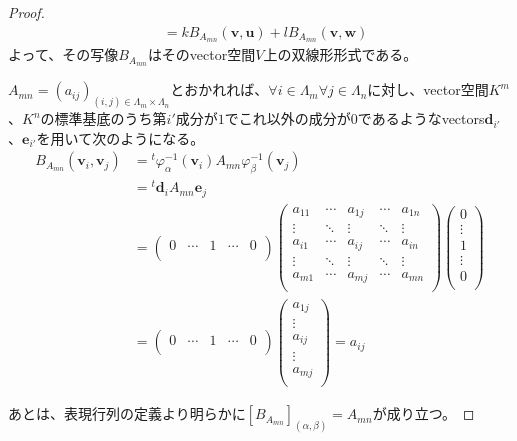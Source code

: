 \documentclass[dvipdfmx]{jsarticle}
\begin{document}
\begin{proof}
\begin{align*}
&= kB_{A_{mn}}\left( \mathbf{v},\mathbf{u} \right) + lB_{A_{mn}}\left( \mathbf{v},\mathbf{w} \right)
\end{align*}
よって、その写像$B_{A_{mn}}$はそのvector空間$V$上の双線形形式である。\par
$A_{mn} = \left( a_{ij} \right)_{(i,j) \in \varLambda_{m} \times \varLambda_{n}}$とおかれれば、$\forall i \in \varLambda_{m}\forall j \in \varLambda_{n}$に対し、vector空間$K^{m}$、$K^{n}$の標準基底のうち第$i'$成分が$1$でこれ以外の成分が$0$であるようなvectors$\mathbf{d}_{i'}$、$\mathbf{e}_{i'}$を用いて次のようになる。
\begin{align*}
B_{A_{mn}}\left( \mathbf{v}_{i},\mathbf{v}_{j} \right) &={}^{t}\varphi_{\alpha}^{- 1}\left( \mathbf{v}_{i} \right)A_{mn}\varphi_{\beta}^{- 1}\left( \mathbf{v}_{j} \right)\\
&={}^{t}\mathbf{d}_{i}A_{mn}\mathbf{e}_{j}\\
&= \begin{pmatrix}
0 & \cdots & 1 & \cdots & 0 \\
\end{pmatrix}\begin{pmatrix}
a_{11} & \cdots & a_{1j} & \cdots & a_{1n} \\
 \vdots & \ddots & \vdots & \ddots & \vdots \\
a_{i1} & \cdots & a_{ij} & \cdots & a_{in} \\
 \vdots & \ddots & \vdots & \ddots & \vdots \\
a_{m1} & \cdots & a_{mj} & \cdots & a_{mn} \\
\end{pmatrix}\begin{pmatrix}
0 \\
 \vdots \\
1 \\
 \vdots \\
0 \\
\end{pmatrix}\\
&= \begin{pmatrix}
0 & \cdots & 1 & \cdots & 0 \\
\end{pmatrix}\begin{pmatrix}
a_{1j} \\
 \vdots \\
a_{ij} \\
 \vdots \\
a_{mj} \\
\end{pmatrix} = a_{ij}
\end{align*}\par
あとは、表現行列の定義より明らかに$\left[ B_{A_{mn}} \right]_{(\alpha,\beta)} = A_{mn}$が成り立つ。
\end{proof}
\end{document}
